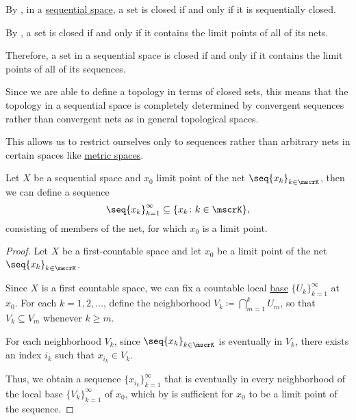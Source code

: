 \begin{remark}\label{rem:sequential_spaces}
  By , in a \hyperref[def:sequential_space]{sequential space}, a set is closed if and only if it is sequentially closed.

  By , a set is closed if and only if it contains the limit points of all of its nets.

  Therefore, a set in a sequential space is closed if and only if it contains the limit points of all of its sequences.

  Since we are able to define a topology in terms of closed sets, this means that the topology in a sequential space is completely determined by convergent sequences rather than convergent nets as in general topological spaces.

  This allows us to restrict ourselves only to sequences rather than arbitrary nets in certain spaces like \hyperref[def:metric_space]{metric spaces}.
\end{remark}

\begin{lemma}\label{thm:sequential_space_convergence}
  Let \( X \) be a sequential space and \( x_0 \) limit point of the net \( \seq{ x_k }_{k \in \mscrK} \), then we can define a sequence
  \begin{equation*}
    \seq{ x_k }_{k=1}^\infty \subseteq \{ x_k \colon k \in \mscrK \},
  \end{equation*}
  consisting of members of the net, for which \( x_0 \) is a limit point.
\end{lemma}
\begin{proof}
  Let \( X \) be a first-countable space and let \( x_0 \) be a limit point of the net \( \seq{ x_k }_{k \in \mscrK} \).

  Since \( X \) is a first countable space, we can fix a countable local \hyperref[def:topological_local_base]{base} \( \{ U_k \}_{k=1}^\infty \) at \( x_0 \). For each \( k = 1, 2, \ldots \), define the neighborhood \( V_k \coloneqq \bigcap_{m=1}^k U_m \), so that \( V_k \subseteq V_m \) whenever \( k \geq m \).

  For each neighborhood \( V_k \), since \( \seq{ x_k }_{k \in \mscrK} \) is eventually in \( V_k \), there exists an index \( i_k \) such that \( x_{i_k} \in V_k \).

  Thus, we obtain a sequence \( \{ x_{i_k} \}_{k=1}^\infty \) that is eventually in every neighborhood of the local base \( \{ V_k \}_{k=1}^\infty \) of \( x_0 \), which by  is sufficient for \( x_0 \) to be a limit point of the sequence.
\end{proof}

